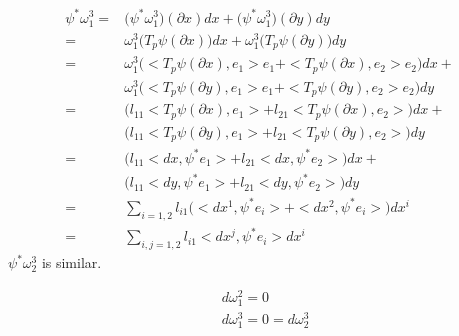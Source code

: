 \documentclass[10pt]{article}
\begin{document}
            \begin{equation*}
                \begin{aligned}
                    \psi^*\omega_1^3 = &\big(\psi^*\omega_1^3\big)(\partial x)dx + \big(\psi^*\omega_1^3\big)(\partial y)dy \\
                    = &\omega_1^3\bigg(T_p\psi(\partial x)\bigg)dx + \omega_1^3\bigg(T_p\psi(\partial y)\bigg)dy \\
                    = &\omega_1^3\bigg( <T_p\psi(\partial x), e_1> e_1 + <T_p\psi(\partial x), e_2> e_2 \bigg)dx + \\
                    &\omega_1^3\bigg( <T_p\psi(\partial y), e_1> e_1 + <T_p\psi(\partial y), e_2> e_2 \bigg)dy \\
                    = &\bigg(l_{11}<T_p\psi(\partial x), e_1> + l_{21}<T_p\psi(\partial x), e_2>\bigg)dx + \\
                    &\bigg(l_{11}<T_p\psi(\partial y), e_1> + l_{21}<T_p\psi(\partial y), e_2>\bigg)dy \\
                    = &\bigg(l_{11}<dx, \psi^*e_1> + l_{21}<dx, \psi^*e_2>\bigg)dx + \\
                    &\bigg(l_{11}<dy, \psi^*e_1> + l_{21}<dy, \psi^*e_2>\bigg)dy \\
                    = &\sum\limits_{i=1,2} l_{i1}\big(<dx^1, \psi^*e_i> + <dx^2, \psi^*e_i>\big) dx^i \\
                    = &\sum\limits_{i,j=1,2} l_{i1}<dx^j, \psi^*e_i> dx^i
                \end{aligned}
            \end{equation*}
            $\psi^*\omega_2^3$ is similar. 
            \begin{theorem}
                \begin{equation*}
                    \begin{aligned}
                        &d\omega_1^2 = 0 \\
                        &d\omega_1^3 = 0 = d\omega_2^3
                    \end{aligned}
                \end{equation*}
            \end{theorem}
\end{document}
